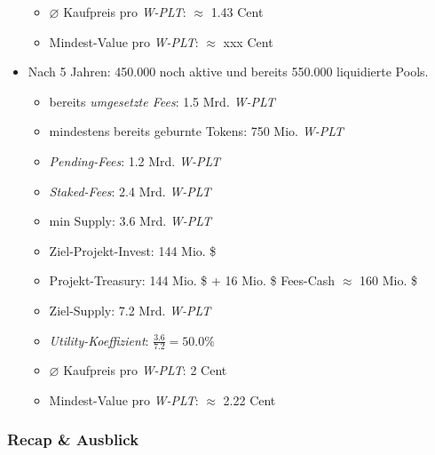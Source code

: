 \begin{Example}
\begin{itemize}
\begin{itemize}
		\item $\varnothing$ Kaufpreis pro \textit{W-PLT}: $\approx$ 1.43 Cent
		\item Mindest-Value pro \textit{W-PLT}: $\approx$ xxx Cent
	\end{itemize}
	\item Nach 5 Jahren: 450.000 noch aktive und bereits 550.000 liquidierte Pools.
	\begin{itemize}
		\item bereits \textit{umgesetzte Fees}: 1.5 Mrd. \textit{W-PLT} 
		\item mindestens bereits geburnte Tokens: 750 Mio. \textit{W-PLT}
		\item \textit{Pending-Fees}: 1.2 Mrd. \textit{W-PLT}
		\item \textit{Staked-Fees}: 2.4 Mrd. \textit{W-PLT} 
		\item min Supply: 3.6 Mrd. \textit{W-PLT} 
		\item Ziel-Projekt-Invest: 144 Mio. \$
		\item Projekt-Treasury: 144 Mio. \$ + 16 Mio. \$ Fees-Cash $\approx$ 160 Mio. \$
		\item Ziel-Supply: 7.2 Mrd. \textit{W-PLT}
		\item \textit{Utility-Koeffizient}: $\frac{3.6}{7.2} = 50.0 \%$
		\item $\varnothing$ Kaufpreis pro \textit{W-PLT}: 2 Cent
		\item Mindest-Value pro \textit{W-PLT}: $\approx$ 2.22 Cent		
	\end{itemize}	 
\end{itemize}

\end{Example}

\vspace{0.5cm}


\vspace{0.5cm}



\subsubsection{Recap \& Ausblick}
\vspace{0.2cm}



\vspace{0.5cm}



